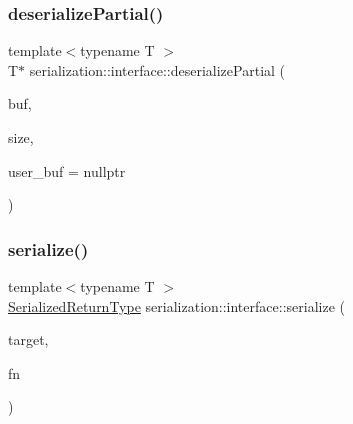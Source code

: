\mbox{\label{namespaceserialization_1_1interface_a08efd64c2c86ef556fd0a2683b9105d6}} 
\subsubsection{\texorpdfstring{deserialize\+Partial()}{deserializePartial()}}
{\footnotesize\ttfamily template$<$typename T $>$ \\
T$\ast$ serialization\+::interface\+::deserialize\+Partial (\begin{DoxyParamCaption}\item[{\hyperlink{namespaceserialization_1_1interface_a718748616a908c35e6080b71d7790a76}{Serial\+Byte\+Type} $\ast$}]{buf,  }\item[{\hyperlink{namespaceserialization_1_1interface_a2ffaaa9b168f9cbcfe454ab036444403}{Size\+Type}}]{size,  }\item[{T $\ast$}]{user\+\_\+buf = {\ttfamily nullptr} }\end{DoxyParamCaption})}

\mbox{\label{namespaceserialization_1_1interface_a97404f513117bf528ec47309512815fb}} 
\subsubsection{\texorpdfstring{serialize()}{serialize()}}
{\footnotesize\ttfamily template$<$typename T $>$ \\
\hyperlink{namespaceserialization_1_1interface_a53410d9804c330ddfaf562ddc8e3c681}{Serialized\+Return\+Type} serialization\+::interface\+::serialize (\begin{DoxyParamCaption}\item[{T \&}]{target,  }\item[{\hyperlink{namespaceserialization_1_1interface_ae1f3fc9ceb0366ab6a877a78ee7377a2}{Buffer\+Callback\+Type}}]{fn }\end{DoxyParamCaption})}

\mbox{\label{namespaceserialization_1_1interface_a358f5ea6192243a92aa7a7c9efc2ea4d}} 
